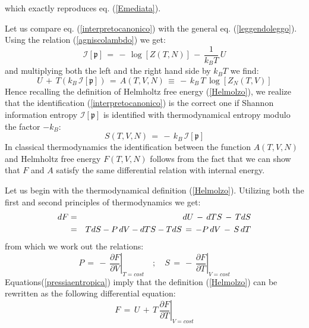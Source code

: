 \documentclass[10pt,a4paper]{article}
\begin{document}
which exactly reproduces eq. (\ref{Emediata}).
\par
Let us compare eq. (\ref{interpretocanonico}) with
the general eq. (\ref{leggendoleggo}). Using the relation
(\ref{agniscolambdo}) we get:
\begin{equation}\label{parfumo}
    \mathcal{I}\left[\mathfrak{p}\right] \, = \, - \,
    \log\left[Z(T,N)\right] \, - \, \frac{1}{k_B T} \, U
\end{equation}
and multiplying both the left and the right hand side by $k_B T$
we find:
\begin{equation}\label{corbezzoli}
    U \, + \, T \left(k_B \, \mathcal{I}\left[\mathfrak{p}\right]\right )
    \, = \, A(T,V,N) \, \equiv \, - \, k_B \, T \, \log
    \left[Z_N\left(T,V\right)\right]
\end{equation}
Hence recalling  the definition of Helmholtz free energy
(\ref{Helmolzo}), we realize that the identification
(\ref{interpretocanonico}) is the correct one if Shannon
information entropy  $\mathcal{I}\left[\mathfrak{p}\right]$
is identified with thermodynamical  entropy modulo the factor
$-k_B$:
\begin{equation}\label{ramificato}
    S(T,V,N) \, = \, - \, k_B \, \mathcal{I}\left[\mathfrak{p}\right]
\end{equation}
In classical thermodynamics the identification  between the function
$A\left(T,V,N\right)$ and Helmholtz free energy
$F\left(T,V,N\right)$ follows from the fact that we  can  show that
$F$ and $A$ satisfy the same differential relation with internal energy.
\par
Let us begin with the thermodynamical definition (\ref{Helmolzo}). Utilizing both the first and second principles of thermodynamics
we get:
\begin{eqnarray}
\label{derivaF}
  dF &=& dU\, -\, dT  S \, - \, T dS \\
  \null &=& T dS -P\,dV - dT S -TdS \, =\, -P\, dV \, - \, S \,
  dT
\end{eqnarray}
from which we work out the relations:
\begin{equation}\label{pressiaentropica}
    P \, = \, - \, \left.\frac{\partial F}{\partial
    V}\right|_{T=cost} \quad ; \quad  S \, = \, - \, \left.\frac{\partial F}{\partial
    T}\right|_{V=cost}
\end{equation}
Equations(\ref{pressiaentropica}) imply that the definition
(\ref{Helmolzo}) can be rewritten  as the following
differential equation:
\begin{equation}\label{diffequoF}
    F \, = \, U \, + \, T \, \left.\frac{\partial F}{\partial
    T}\right|_{V=cost}
\end{equation}
\end{document}
